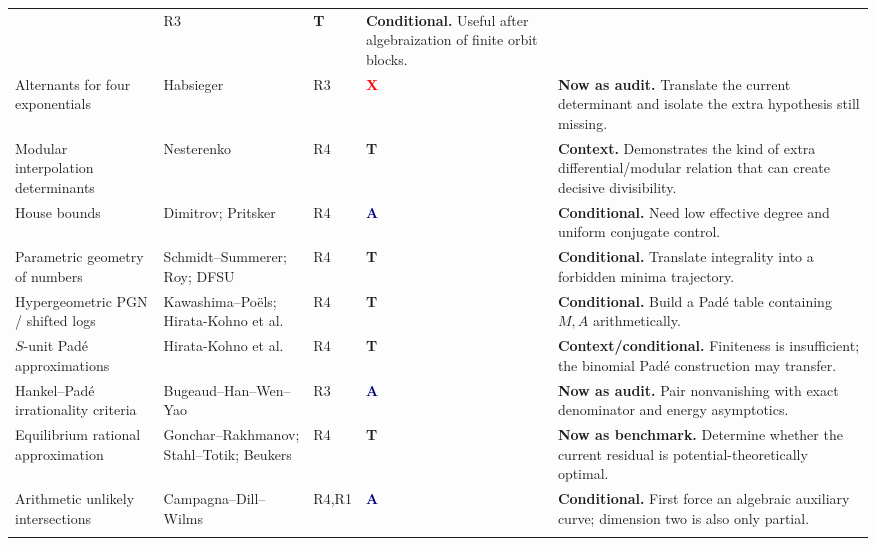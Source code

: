 \documentclass[10pt,letterpaper]{article}
\newcommand{\Rone}{\textsf{R1}}
\newcommand{\Rthree}{\textsf{R3}}
\newcommand{\Rfour}{\textsf{R4}}
\newcommand{\badgeAdapt}{\textcolor{navy}{\textbf{A}}}
\newcommand{\badgeTemplate}{\textcolor{amber}{\textbf{T}}}
\newcommand{\badgeDiagnostic}{\textcolor{red}{\textbf{X}}}
\begin{document}
\begin{longtable}{@{}L{0.225\textwidth}L{0.275\textwidth}C{0.08\textwidth}C{0.065\textwidth}L{0.30\textwidth}@{}}
\cite{BinyaminiCluckersKato,CCDN2020} & \Rthree & \badgeTemplate & \textbf{Conditional.}
Useful after algebraization of finite orbit blocks.\\
\addlinespace
Alternants for four exponentials & Habsieger \cite{Habsieger2007} & \Rthree &
\badgeDiagnostic & \textbf{Now as audit.} Translate the current determinant and isolate the
extra hypothesis still missing.\\
\addlinespace
Modular interpolation determinants & Nesterenko \cite{Nesterenko1996} & \Rfour &
\badgeTemplate & \textbf{Context.} Demonstrates the kind of extra differential/modular
relation that can create decisive divisibility.\\
\addlinespace
House bounds & Dimitrov; Pritsker \cite{DimitrovSZ,PritskerHouse} & \Rfour & \badgeAdapt &
\textbf{Conditional.} Need low effective degree and uniform conjugate control.\\
\addlinespace
Parametric geometry of numbers & Schmidt--Summerer; Roy; DFSU
\cite{SchmidtSummerer,RoyPGN,DFSU2024} & \Rfour & \badgeTemplate & \textbf{Conditional.}
Translate integrality into a forbidden minima trajectory.\\
\addlinespace
Hypergeometric PGN / shifted logs & Kawashima--Po\"els; Hirata-Kohno et al.
\cite{KawashimaPoels,HirataKohnoMuroiWashio} & \Rfour & \badgeTemplate &
\textbf{Conditional.} Build a Pad\'e table containing \(M,A\) arithmetically.\\
\addlinespace
\(S\)-unit Pad\'e approximations & Hirata-Kohno et al. \cite{SUnitPade} & \Rfour &
\badgeTemplate & \textbf{Context/conditional.} Finiteness is insufficient; the binomial
Pad\'e construction may transfer.\\
\addlinespace
Hankel--Pad\'e irrationality criteria & Bugeaud--Han--Wen--Yao
\cite{BugeaudHanWenYao} & \Rthree & \badgeAdapt & \textbf{Now as audit.} Pair nonvanishing
with exact denominator and energy asymptotics.\\
\addlinespace
Equilibrium rational approximation & Gonchar--Rakhmanov; Stahl--Totik; Beukers
\cite{GoncharRakhmanov,StahlTotik,BeukersPade} & \Rfour & \badgeTemplate & \textbf{Now as
benchmark.} Determine whether the current residual is potential-theoretically optimal.\\
\addlinespace
Arithmetic unlikely intersections & Campagna--Dill--Wilms \cite{CampagnaDillWilms} &
\Rfour,\Rone & \badgeAdapt & \textbf{Conditional.} First force an algebraic auxiliary curve;
dimension two is also only partial.\\
\addlinespace

\end{longtable}
\end{document}
